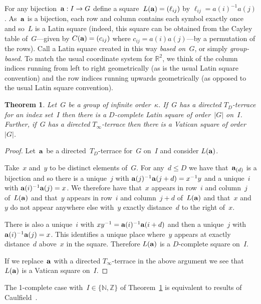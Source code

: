 \documentclass[12pt,a4paper]{article}
\newtheorem{thm}{Theorem}[section]
\newcommand{\Z}{\mathbb{Z}}
\newcommand{\N}{\mathbb{N}}
\newcommand{\R}{\mathbb{R}}
\begin{document}
For any bijection~${\bf a}: I \rightarrow G$ define a square~$L({\bf a}) = (\ell_{ij})$ by $\ell_{ij} = a(i)^{-1}a(j)$.   As~${\bf a}$ is a bijection, each row and column contains each symbol exactly once and so~$L$ is a Latin square (indeed, this square can be obtained from the Cayley table of~$G$---given by $C({\bf a}) = (c_{ij})$ where $c_{ij} = a(i)a(j)$---by a permutation of the rows).   Call a Latin square created in this way {\em based on~$G$}, or simply {\em group-based}.  To match the usual coordinate system for $\R^2$, we think of the column indices running from left to right geometrically (as is the usual Latin square convention) and the row indices running upwards geometrically (as opposed to the usual Latin square convention).

\begin{thm}\label{th:terrace2square}
Let~$G$ be a group of infinite order~$\kappa$.  If~$G$ has a directed $T_{D}$-terrace for an index set~$I$ then there is a $D$-complete Latin square of order~$|G|$ on~$I$.  Further, if~$G$ has a directed $T_{\infty}$-terrace then there is a Vatican square of order~$|G|$.
\end{thm}

\begin{proof}
Let~${\bf a}$ be a directed~$T_D$-terrace for~$G$ on~$I$ and consider $L({\bf a})$.

Take~$x$ and~$y$ to be distinct elements of~$G$.  For any~$d \leq D$ we have that~${\bf a}_{(d)}$ is a bijection and so there is a unique~$j$ with ${\bf a}(j)^{-1}{\bf a}(j+d) = x^{-1}y$ and a unique~$i$ with ${\bf a}(i)^{-1}{\bf a}(j)=x$.  We therefore have that~$x$ appears in row~$i$ and column~$j$ of~$L({\bf a})$ and that~$y$ appears in row~$i$ and column~$j+d$ of~$L({\bf a})$ and that~$x$ and~$y$ do not appear anywhere else with~$y$ exactly distance~$d$  to the right of~$x$.

There is also a unique~$i$ with $xy^{-1} = {\bf a}(i)^{-1}{\bf a}(i+d)$ and then a unique~$j$ with ${\bf a}(i)^{-1}{\bf a}(j)=x$.  This identifies a unique place where~$y$ appears at exactly distance~$d$ above~$x$ in the square.  Therefore $L({\bf a})$ is a $D$-complete square on~$I$.

If we replace~${\bf a}$ with a directed $T_{\infty}$-terrace in the above argument we see that~$L({\bf a})$ is a Vatican square on~$I$.
\end{proof}

The 1-complete case with~$I \in \{ \N, \Z \}$ of Theorem~\ref{th:terrace2square} is equivalent to results of Caulfield~\cite{Caulfield96}.
\end{document}
